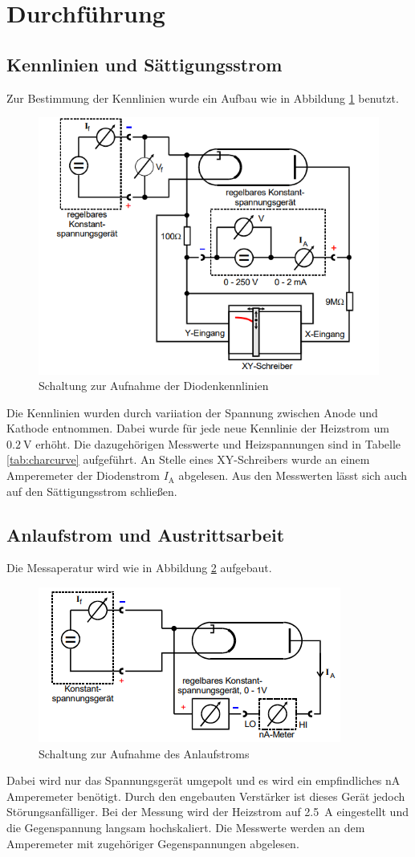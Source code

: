 \section{Durchführung}
\label{sec:Durchführung}
\subsection{Kennlinien und Sättigungsstrom}
Zur Bestimmung der Kennlinien wurde ein Aufbau wie in Abbildung \ref{fig:aufbaua} benutzt.
\begin{figure}
    \centering
    \caption{Schaltung zur Aufnahme der Diodenkennlinien \cite{v504}}
    \label{fig:aufbaua}
    \includegraphics[width = 0.5 \textwidth]{pics/Aufbaua.png}
\end{figure}
Die Kennlinien wurden durch variiation der Spannung zwischen Anode und Kathode entnommen. Dabei wurde für jede neue Kennlinie der Heizstrom um $\SI{0.2}{\volt}$ erhöht.
Die dazugehörigen Messwerte und Heizspannungen sind in Tabelle \ref{tab:charcurve} aufgeführt. 
An Stelle eines XY-Schreibers wurde an einem Amperemeter der Diodenstrom $I_\text{A}$ abgelesen.
Aus den Messwerten lässt sich auch auf den Sättigungsstrom schließen.

\subsection{Anlaufstrom und Austrittsarbeit}
Die Messaperatur wird wie in Abbildung \ref{fig:aufbauc} aufgebaut.
\begin{figure}
    \centering
    \caption{Schaltung zur Aufnahme des Anlaufstroms \cite{v504}}
    \label{fig:aufbauc}
    \includegraphics[width = 0.5 \textwidth]{pics/Aufbauc.png}
\end{figure}
Dabei wird nur das Spannungsgerät umgepolt und es wird ein empfindliches $\si{\nano\ampere}$ Amperemeter benötigt. Durch den engebauten Verstärker ist dieses Gerät jedoch Störungsanfälliger.
Bei der Messung wird der Heizstrom auf \SI{2.5}{\ampere} eingestellt und die Gegenspannung langsam hochskaliert. Die Messwerte werden an dem Amperemeter mit zugehöriger Gegenspannungen abgelesen.

